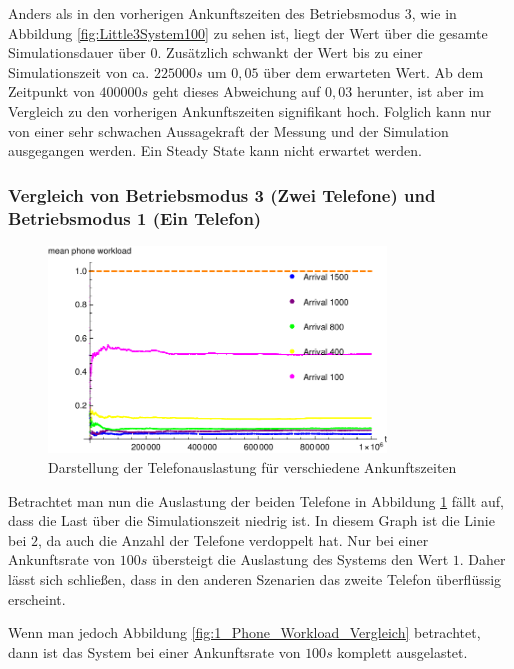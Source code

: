 Anders als in den vorherigen Ankunftszeiten des Betriebsmodus 3, wie in Abbildung \ref{fig:Little3System100} zu sehen ist, liegt der Wert über die gesamte Simulationsdauer über $0$. Zusätzlich schwankt der Wert bis zu einer Simulationszeit von ca. $225000s$ um $0,05$ über dem erwarteten Wert. Ab dem Zeitpunkt von $400000s$ geht dieses Abweichung auf $0,03$ herunter, ist aber im Vergleich zu den vorherigen Ankunftszeiten signifikant hoch. Folglich kann nur von einer sehr schwachen Aussagekraft der Messung und der Simulation ausgegangen werden. Ein Steady State kann nicht erwartet werden.

\subsubsection{Vergleich von Betriebsmodus 3 (Zwei Telefone) und Betriebsmodus 1 (Ein Telefon)}

\begin{figure}[htpb]
	\centering
	\includegraphics[width=0.8\textwidth]{abbildungen/2_Phone_VIP/Auslastung_Vegleich/MeanPhoneWorkload.pdf}
	\caption{Darstellung der Telefonauslastung für verschiedene Ankunftszeiten}
	\label{fig:2_Phone_Workload_Vergleich}
\end{figure}

Betrachtet man nun die Auslastung der beiden Telefone in Abbildung \ref{fig:2_Phone_Workload_Vergleich} fällt auf, dass die Last über die Simulationszeit niedrig ist. In diesem Graph ist die Linie bei $2$, da auch die Anzahl der Telefone verdoppelt hat. Nur bei einer Ankunftsrate von $100s$ übersteigt die Auslastung des Systems den Wert $1$. Daher lässt sich schließen, dass in den anderen Szenarien das zweite Telefon überflüssig erscheint.

Wenn man jedoch Abbildung \ref{fig:1_Phone_Workload_Vergleich} betrachtet, dann ist das System bei einer Ankunftsrate von $100s$ komplett ausgelastet.

